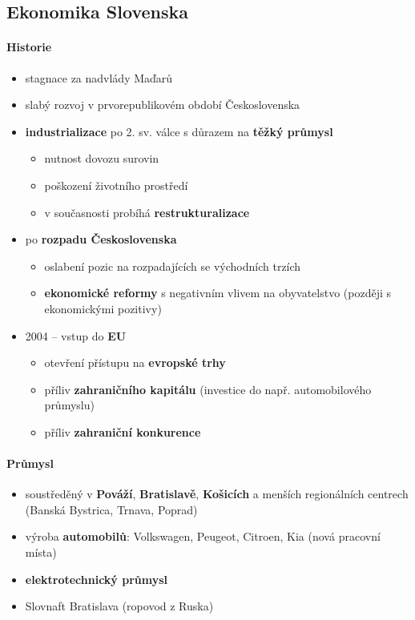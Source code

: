 \subsection{Ekonomika Slovenska}
\paragraph{Historie}
\begin{itemize}
\item stagnace za nadvlády Maďarů
\item slabý rozvoj v prvorepublikovém období Československa
\item \textbf{industrializace} po 2. sv. válce s důrazem na \textbf{těžký průmysl}
	\begin{itemize}
	\item nutnost dovozu surovin
	\item poškození životního prostředí
	\item v současnosti probíhá \textbf{restrukturalizace}
	\end{itemize}
\item po\textbf{ rozpadu Československa}
	\begin{itemize}
	\item oslabení pozic na rozpadajících se východních trzích
	\item \textbf{ekonomické reformy} s negativním vlivem na obyvatelstvo (později s ekonomickými pozitivy)
	\end{itemize}
\item 2004 -- vstup do \textbf{EU}
	\begin{itemize}
	\item otevření přístupu na \textbf{evropské trhy}	
	\item příliv \textbf{zahraničního kapitálu} (investice do např. automobilového průmyslu)
	\item příliv \textbf{zahraniční konkurence}
	\end{itemize}
\end{itemize}

\paragraph{Průmysl}
\begin{itemize}
\item soustředěný v \textbf{Pováží}, \textbf{Bratislavě}, \textbf{Košicích} a menších regionálních centrech (Banská Bystrica, Trnava, Poprad)
\item výroba \textbf{automobilů}: Volkswagen, Peugeot, Citroen, Kia (nová pracovní místa)
\item \textbf{elektrotechnický průmysl}
\item Slovnaft Bratislava (ropovod z Ruska)
\end{itemize}

